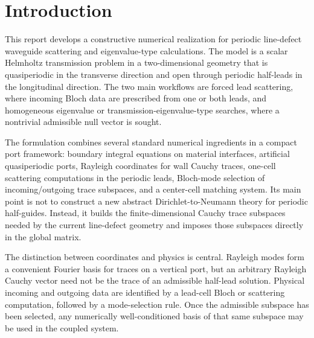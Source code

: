%
%
%
%
%

\section{Introduction}

This report develops a constructive numerical realization for periodic
line-defect waveguide scattering and eigenvalue-type calculations.  The model is
a scalar Helmholtz transmission problem in a two-dimensional geometry that is
quasiperiodic in the transverse direction and open through periodic half-leads
in the longitudinal direction.  The two main workflows are forced lead
scattering, where incoming Bloch data are prescribed from one or both leads, and
homogeneous eigenvalue or transmission-eigenvalue-type searches, where a
nontrivial admissible null vector is sought.

The formulation combines several standard numerical ingredients in a compact
port framework: boundary integral equations on material interfaces, artificial
quasiperiodic ports, Rayleigh coordinates for wall Cauchy traces, one-cell
scattering computations in the periodic leads, Bloch-mode selection of
incoming/outgoing trace subspaces, and a center-cell matching system.  Its main
point is not to construct a new abstract Dirichlet-to-Neumann theory for
periodic half-guides.  Instead, it builds the finite-dimensional Cauchy trace
subspaces needed by the current line-defect geometry and imposes those
subspaces directly in the global matrix.

The distinction between coordinates and physics is central.  Rayleigh modes form
a convenient Fourier basis for traces on a vertical port, but an arbitrary
Rayleigh Cauchy vector need not be the trace of an admissible half-lead solution.
Physical incoming and outgoing data are identified by a lead-cell Bloch or
scattering computation, followed by a mode-selection rule.  Once the admissible
subspace has been selected, any numerically well-conditioned basis of that same
subspace may be used in the coupled system.

